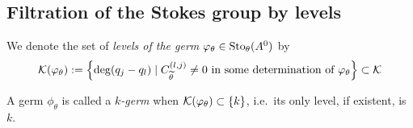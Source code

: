\subsection{Filtration of the Stokes group by levels}
\begin{comment}
  See
  \cite{Loday1994}
  and
  \cite[362ff]{Martinet1991}
\end{comment}
We denote the set of \emph{levels of the germ}
$\varphi_{\theta}\in\operatorname{Sto}_\theta(A^0)$ by
\[
  \mathcal{K}(\varphi_\theta):= \left\{\deg(q_j-q_l)\mid C_{\widetilde\theta}^{(l,j)}\neq0
    \text{ in some determination of }\varphi_\theta\right\} \subset \mathcal{K}
\]
\begin{defn}
  A germ $\phi_\theta$ is called a \emph{$k$-germ} when
  $\mathcal{K}(\varphi_{\theta})\subset\{k\}$, i.e.\ its only level, if existent, is $k$.
\end{defn}

